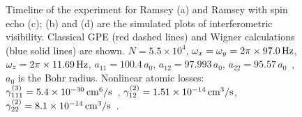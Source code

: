 \begin{figure}

    \caption{
    Timeline of the experiment for Ramsey (a) and Ramsey with spin echo (c); (b) and (d) are the simulated plots of interferometric visibility.
    Classical GPE (red dashed lines) and Wigner calculations (blue solid lines) are shown.
    $N = 5.5 \times 10^4$,
    $\omega_x = \omega_y = 2 \pi \times 97.0\mbox{\ensuremath{\,\mathrm{Hz}}}$,
    $\omega_z = 2 \pi \times 11.69\mbox{\ensuremath{\,\mathrm{Hz}}}$,
    $a_{11} = 100.4\,a_0$, $a_{12} = 97.993\,a_0$, $a_{22} = 95.57\,a_0$~\cite{Egorov2011},
    $a_0$ is the Bohr radius.
    Nonlinear atomic losses:
    $\gamma^{(3)}_{111} = 5.4 \times 10^{-30}\mbox{\ensuremath{\,\mathrm{cm^6/s}}}$~\cite{Mertes2007},
    $\gamma^{(2)}_{12} = 1.51 \times 10^{-14}\mbox{\ensuremath{\,\mathrm{cm^3/s}}}$,
    $\gamma^{(2)}_{22} = 8.1 \times 10^{-14}\mbox{\ensuremath{\,\mathrm{cm^3/s}}}$~\cite{Egorov2011}.}

    \label{fig:visibility}
\end{figure}


